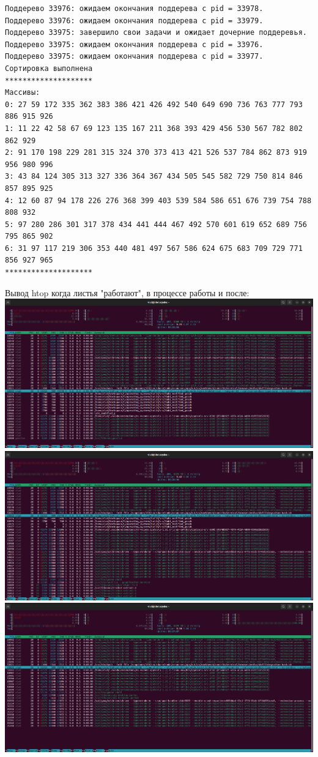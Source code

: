 \documentclass[a4paper,14pt]{extarticle}
\begin{document}
\begin{verbatim}
Поддерево 33976: ожидаем окончания поддерева с pid = 33978.
Поддерево 33976: ожидаем окончания поддерева с pid = 33979.
Поддерево 33975: завершило свои задачи и ожидает дочерние поддеревья.
Поддерево 33975: ожидаем окончания поддерева с pid = 33976.
Поддерево 33975: ожидаем окончания поддерева с pid = 33977.
Сортировка выполнена
********************
Массивы:
0: 27 59 172 335 362 383 386 421 426 492 540 649 690 736 763 777 793 886 915 926 
1: 11 22 42 58 67 69 123 135 167 211 368 393 429 456 530 567 782 802 862 929 
2: 91 170 198 229 281 315 324 370 373 413 421 526 537 784 862 873 919 956 980 996 
3: 43 84 124 305 313 327 336 364 367 434 505 545 582 729 750 814 846 857 895 925 
4: 12 60 87 94 178 226 276 368 399 403 539 584 586 651 676 739 754 788 808 932 
5: 97 280 286 301 317 378 434 441 444 467 492 570 601 619 652 689 756 795 865 902 
6: 31 97 117 219 306 353 440 481 497 567 586 624 675 683 709 729 771 856 927 965 
********************
\end{verbatim}
Вывод htop когда листья "работают", в процессе работы и после:\\
\includegraphics[width=140mm]{modified_htop_before}\\
\includegraphics[width=140mm]{modified_htop_mid}\\
\includegraphics[width=140mm]{modified_htop_after}\\
\end{document}
